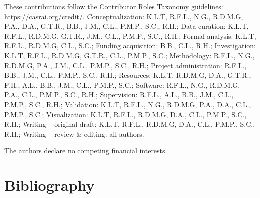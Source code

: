 \begin{contributions}
 These contributions follow the Contributor Roles Taxonomy guidelines: \href{https://casrai.org/credit/}{https://casrai.org/credit/}.
 Conceptualization: K.L.T, R.F.L., N.G., R.D.M.G, P.A., D.A., G.T.R., B.B., J.M., C.L., P.M.P., S.C., R.H.;
 Data curation: K.L.T, R.F.L., R.D.M.G, G.T.R., J.M., C.L., P.M.P., S.C., R.H.;
 Formal analysis:  K.L.T, R.F.L., R.D.M.G, C.L., S.C.;
 Funding acquisition:  B.B., C.L., R.H.;
 Investigation: K.L.T, R.F.L., R.D.M.G, G.T.R., C.L., P.M.P., S.C.;
 Methodology: R.F.L., N.G., R.D.M.G, P.A., J.M., C.L., P.M.P., S.C., R.H.;
 Project administration: R.F.L., B.B., J.M., C.L., P.M.P., S.C., R.H.;
 Resources: K.L.T, R.D.M.G, D.A., G.T.R., F.H., A.L., B.B., J.M., C.L., P.M.P., S.C.;
 Software: R.F.L., N.G., R.D.M.G, P.A., C.L., P.M.P., S.C., R.H.;
 Supervision: R.F.L., A.L., B.B., J.M., C.L., P.M.P., S.C., R.H.;
 Validation: K.L.T, R.F.L., N.G., R.D.M.G, P.A., D.A., C.L., P.M.P., S.C.;
 Visualization:  K.L.T, R.F.L., R.D.M.G, D.A., C.L., P.M.P., S.C., R.H.;
 Writing – original draft: K.L.T, R.F.L., R.D.M.G, D.A., C.L., P.M.P., S.C., R.H.;
 Writing – review \& editing: all authors.

\end{contributions}

\begin{interests}
 The authors declare no competing financial interests.
\end{interests}

\section*{Bibliography}


